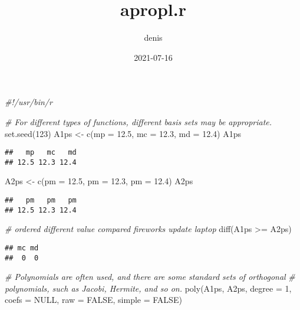 \documentclass[
]{article}
\title{apropl.r}
\author{denis}
\date{2021-07-16}
\newenvironment{Shaded}{\begin{snugshade}}{\end{snugshade}}
\newcommand{\AttributeTok}[1]{\textcolor[rgb]{0.77,0.63,0.00}{#1}}
\newcommand{\CommentTok}[1]{\textcolor[rgb]{0.56,0.35,0.01}{\textit{#1}}}
\newcommand{\ConstantTok}[1]{\textcolor[rgb]{0.00,0.00,0.00}{#1}}
\newcommand{\DecValTok}[1]{\textcolor[rgb]{0.00,0.00,0.81}{#1}}
\newcommand{\FloatTok}[1]{\textcolor[rgb]{0.00,0.00,0.81}{#1}}
\newcommand{\FunctionTok}[1]{\textcolor[rgb]{0.00,0.00,0.00}{#1}}
\newcommand{\NormalTok}[1]{#1}
\newcommand{\OtherTok}[1]{\textcolor[rgb]{0.56,0.35,0.01}{#1}}
\newcommand{\SpecialCharTok}[1]{\textcolor[rgb]{0.00,0.00,0.00}{#1}}
\begin{document}
\maketitle

\begin{Shaded}
\begin{Highlighting}[]
\CommentTok{\#!/usr/bin/r}

\CommentTok{\# For different types of functions, different basis sets may be appropriate.}
\FunctionTok{set.seed}\NormalTok{(}\DecValTok{123}\NormalTok{)}
\NormalTok{A1ps }\OtherTok{\textless{}{-}} \FunctionTok{c}\NormalTok{(}\AttributeTok{mp =} \FloatTok{12.5}\NormalTok{, }\AttributeTok{mc =} \FloatTok{12.3}\NormalTok{, }\AttributeTok{md =} \FloatTok{12.4}\NormalTok{)}
\NormalTok{A1ps  }
\end{Highlighting}
\end{Shaded}

\begin{verbatim}
##   mp   mc   md 
## 12.5 12.3 12.4
\end{verbatim}

\begin{Shaded}
\begin{Highlighting}[]
\NormalTok{A2ps }\OtherTok{\textless{}{-}} \FunctionTok{c}\NormalTok{(}\AttributeTok{pm =} \FloatTok{12.5}\NormalTok{, }\AttributeTok{pm =} \FloatTok{12.3}\NormalTok{, }\AttributeTok{pm =} \FloatTok{12.4}\NormalTok{)}
\NormalTok{A2ps  }
\end{Highlighting}
\end{Shaded}

\begin{verbatim}
##   pm   pm   pm 
## 12.5 12.3 12.4
\end{verbatim}

\begin{Shaded}
\begin{Highlighting}[]
\CommentTok{\# ordered different value compared fireworks update laptop}
\FunctionTok{diff}\NormalTok{(A1ps }\SpecialCharTok{\textgreater{}=}\NormalTok{ A2ps)}
\end{Highlighting}
\end{Shaded}

\begin{verbatim}
## mc md 
##  0  0
\end{verbatim}

\begin{Shaded}
\begin{Highlighting}[]
\CommentTok{\# Polynomials are often used, and there are some standard sets of orthogonal }
\CommentTok{\# polynomials, such as Jacobi, Hermite, and so on.}
\FunctionTok{poly}\NormalTok{(A1ps, A2ps, }\AttributeTok{degree =} \DecValTok{1}\NormalTok{, }\AttributeTok{coefs =} \ConstantTok{NULL}\NormalTok{, }\AttributeTok{raw =} \ConstantTok{FALSE}\NormalTok{, }\AttributeTok{simple =} \ConstantTok{FALSE}\NormalTok{)}
\end{Highlighting}
\end{Shaded}
\end{document}
